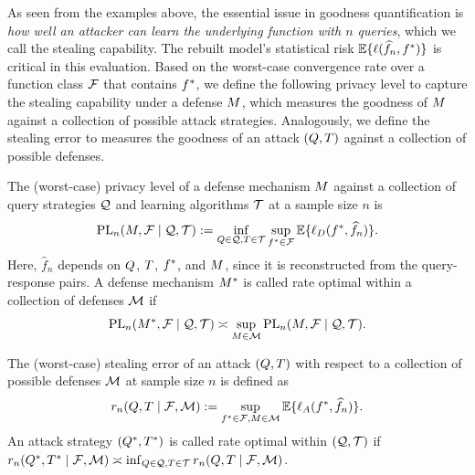        As seen from the examples above, the essential issue in goodness quantification is \textit{how well an attacker can learn the underlying function with $n$ queries}, which we call the stealing capability. 
        The rebuilt model's statistical risk $\mathbb{E} \{ \ell(\widehat{f}_n, f^*)\}$ is critical in this evaluation. 
        Based on the worst-case convergence rate over a function class $\mathcal{F}$ that contains $f^*$, we define the following privacy level to capture the stealing capability under a defense $M$, which measures the goodness of $M$ against a collection of possible attack strategies. Analogously, we define the stealing error to measures the goodness of an attack $(Q,T)$ against a collection of possible defenses. 
        \begin{definition}\label{def:priv}
            The (worst-case) privacy level of a defense mechanism $M$ against a collection of query strategies $\mathcal{Q}$ and learning algorithms $\mathcal{T}$ at a sample size $n$ is 
             \begin{align*}
                \textrm{PL}_n(M,\mathcal{F} \mid \mathcal{Q},\mathcal{T}) :=  \inf_{Q \in \mathcal{Q},T \in \mathcal{T}} \sup_{f^* \in \mathcal{F}} \mathbb{E} \{ \ell_D(f^*, \widehat{f}_n) \}. 
            \end{align*}
        Here, $\hat{f}_n$ depends on $Q$, $T$, $f^*$, and $M$, since it is reconstructed from the query-response pairs.
        A defense mechanism $M^*$ is called rate optimal within a collection of defenses $\mathcal{M}$ if
        \begin{align*}
            \textrm{PL}_n(M^*,\mathcal{F} \mid \mathcal{Q},\mathcal{T}) \asymp \sup_{M \in \mathcal{M}}  \textrm{PL}_n(M,\mathcal{F} \mid \mathcal{Q},\mathcal{T}).
        \end{align*}
        \end{definition}


        \begin{definition}\label{def:stealerror}
            The (worst-case) stealing error of an attack $(Q,T)$ with respect to a collection of possible defenses $\mathcal{M}$ at sample size $n$ is defined as 
            \begin{align*}
                r_n(Q, T \mid \mathcal{F},\mathcal{M}) := \sup_{f^* \in \mathcal{F}, M \in \mathcal{M}} \mathbb{E} \{ \ell_A(f^*, \widehat{f}_n) \}.
            \end{align*}
        An attack strategy $(Q^*, T^*)$ is called rate optimal within $(\mathcal{Q},\mathcal{T})$ if $ r_n(Q^*, T^* \mid \mathcal{F},\mathcal{M}) \asymp \inf_{Q \in \mathcal{Q}, T \in \mathcal{T}}  r_n(Q, T \mid \mathcal{F},\mathcal{M}) $.
        \end{definition}

